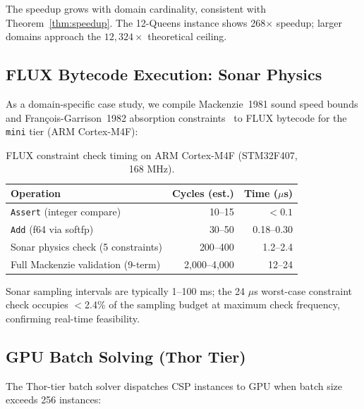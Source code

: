 \documentclass[sigplan,10pt,review]{acmart}
\begin{document}
\noindent The speedup grows with domain cardinality, consistent with
Theorem~\ref{thm:speedup}. The 12-Queens instance shows 268$\times$ speedup;
larger domains approach the $12{,}324\times$ theoretical ceiling.

\subsection{FLUX Bytecode Execution: Sonar Physics}

As a domain-specific case study, we compile Mackenzie~1981 sound speed bounds
and Fran\c{c}ois-Garrison~1982 absorption constraints~\cite{francois1982}
to FLUX bytecode for the \texttt{mini} tier (ARM Cortex-M4F):

\begin{table}[h]
\centering
\caption{FLUX constraint check timing on ARM Cortex-M4F (STM32F407, 168 MHz).}
\label{tab:arm}
\renewcommand{\arraystretch}{1.2}
\begin{tabular}{lrr}
\toprule
\textbf{Operation} & \textbf{Cycles (est.)} & \textbf{Time ($\mu$s)} \\
\midrule
\texttt{Assert} (integer compare)  & 10--15      & $<0.1$ \\
\texttt{Add} (f64 via softfp)      & 30--50      & 0.18--0.30 \\
Sonar physics check (5 constraints) & 200--400  & 1.2--2.4 \\
Full Mackenzie validation (9-term) & 2,000--4,000 & 12--24 \\
\bottomrule
\end{tabular}
\end{table}

Sonar sampling intervals are typically 1--100 ms; the 24 $\mu$s worst-case
constraint check occupies $<$2.4\% of the sampling budget at maximum check
frequency, confirming real-time feasibility.

\subsection{GPU Batch Solving (Thor Tier)}

The Thor-tier batch solver dispatches CSP instances to GPU when batch size
exceeds 256 instances:
\end{document}

